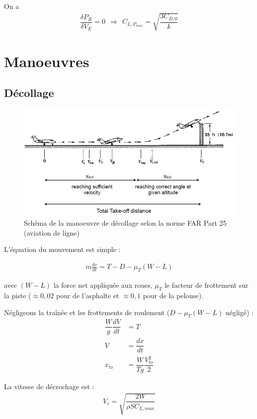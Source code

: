 \documentclass{report}
\begin{document}
On a \begin{eqnarray}
\dfrac{\delta P_R}{\delta V_E}=0 ~~\Rightarrow~~C_{L,P_{max}}=\sqrt{\dfrac{3C_{D,0}}{k}}
\end{eqnarray}

\section{Manoeuvres}

\subsection{Décollage}

\begin{figure}[h!]
    \centering
    \includegraphics[scale=0.7]{14.JPG}
    \caption{Schéma de la manoeuvre de décollage selon la norme FAR Part 25 (aviation de ligne)}
    \label{14}
\end{figure}

L'équation du mouvement est simple :

\begin{eqnarray}
m\frac{dv}{dt} = T-D-\mu_T (W-L)
\end{eqnarray}

avec $(W-L)$ la force net appliquée aux roues, $\mu_T$ le facteur de frottement sur la piste ($\approx 0,02$ pour de l'asphalte et $\approx0,1$ pour de la pelouse).

Négligeons la traînée et les frottements de roulement ($D-\mu_T(W-L)$ négligé) :
\begin{eqnarray}
\dfrac{W}{g}\dfrac{dV}{dt}&=T\\
V&=\dfrac{dx}{dt}\\
x_{to}&=\dfrac{W}{Tg}\dfrac{V_{to}^2}{2}
\end{eqnarray}

La vitesse de décrochage est :
\begin{eqnarray}
V_s=\sqrt{\dfrac{2W}{\rho S C_{L,max}}}
\end{eqnarray}
\end{document}
